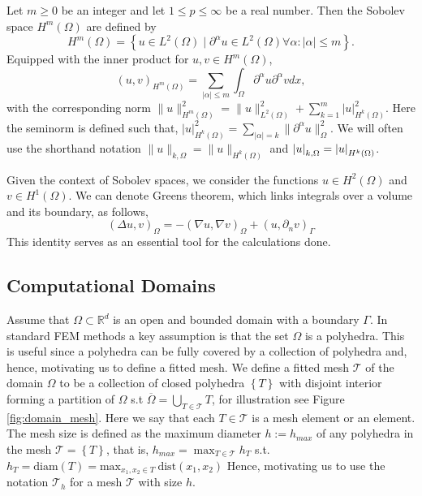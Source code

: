   Let $m\ge 0$ be an integer and let $1 \le  p \le  \infty$ be a real number. Then the Sobolev space $H^{m}( \Omega ) $ are defined by
\[
H^{m}\left( \Omega  \right) = \left\{ u \in L^{2}\left( \Omega  \right)  \mid  \partial ^{\alpha } u \in L^{2}\left( \Omega  \right)  \forall \alpha : \left\lvert \alpha  \right\rvert  \le m \right\}.
\]
Equipped with the inner product for $u,v \in H^{m}\left( \Omega  \right) $, \[
    \left( u,v \right) _{H^{m}\left( \Omega   \right) } = \sum_{\left\lvert \alpha  \right\rvert  \le  m}^{}  \int_{\Omega }^{} \partial ^{\alpha } u \partial ^{\alpha } v dx,
\]
with the corresponding norm
$
\| u \|_{ H^{m}\left( \Omega  \right)  }^{2  }  =  \| u \|_{ L^{2}\left( \Omega  \right)    }^{2} + \sum_{k = 1}^{m}  \left\lvert u \right\rvert ^{2} _{  H^{k}\left( \Omega  \right) }.
$
Here the seminorm is defined such that, $ \left\lvert u \right\rvert _{H^{k}( \Omega  ) }^{2} =  \sum_{\left\lvert \alpha  \right\rvert  = k}^{} \| \partial ^{\alpha }u \|_{ \Omega  }^{ 2 }  .
$
We will often use the shorthand notation $ \| u \|_{ k, \Omega  }^{  } = \| u \|_{ H^{k}( \Omega)  }^{  } $ and $ \left\lvert  u  \right\rvert_{ k, \Omega  }^{  }  = \left\lvert  u  \right\rvert_{ H^{k}( \Omega)  }^{  }$.

Given the context of Sobolev spaces, we consider the functions $ u \in H^{2}( \Omega )$ and $ v \in H^{1}( \Omega )$. We can denote Greens theorem, which links integrals over a volume and its boundary, as follows,
\[
( \Delta u, v) _{\Omega } = -( \nabla u, \nabla v)_{\Omega } + ( u, \partial _{n}v)_{\Gamma }
\]
This identity serves as an essential tool for the calculations done.



\subsection{Computational Domains}%
\label{sub:computational_domain}
Assume that $\Omega \subset \mathbb{R} ^{d} $ is an open and bounded domain with a boundary $\Gamma $. In standard FEM methods a key assumption is that the set $\Omega $ is a polyhedra. This is useful since a polyhedra can be fully covered by a collection of polyhedra and, hence, motivating us to define a fitted mesh.
We define a fitted mesh $\mathcal{T} $ of the domain $\Omega $ to be a collection of closed polyhedra $\left\{ T \right\}  $ with disjoint interior forming a partition of $\Omega $ s.t $\overline{\Omega } = \bigcup _{T \in \mathcal{T} } T $, for illustration see Figure
\ref{fig:domain_mesh}.
Here we say that each $T \in  \mathcal{T} $ is a mesh element or an element.
The mesh size is defined as the maximum diameter $h := h_{max} $ of any polyhedra in the mesh $\mathcal{T} = \left\{ T \right\}  $, that is, $ h_{max} = \max_{T \in \mathcal{T} }  h_{T}$ s.t.
$h _{T}  = \mathrm{diam}\left( T \right)   = \mathrm{max}_{x_1, x_{2} \in T} \ \mathrm{ dist }(x_{1}, x_{2})$
Hence, motivating us to use the notation $\mathcal{T} _{h}$ for a mesh $\mathcal{T} $ with size $h$.

